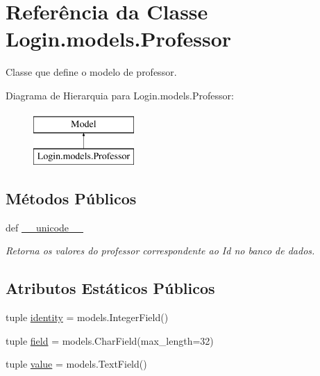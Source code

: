 \hypertarget{classLogin_1_1models_1_1Professor}{\section{Referência da Classe Login.\-models.\-Professor}
\label{dd/d57/classLogin_1_1models_1_1Professor}
}


Classe que define o modelo de professor.  


Diagrama de Hierarquia para Login.\-models.\-Professor\-:\begin{figure}[H]
\begin{center}
\leavevmode
\includegraphics[height=2.000000cm]{dd/d57/classLogin_1_1models_1_1Professor}
\end{center}
\end{figure}
\subsection*{Métodos Públicos}
\begin{DoxyCompactItemize}
\item 
def \hyperlink{classLogin_1_1models_1_1Professor_a018fdfc94208093b24334e0a0a6ef702}{\-\_\-\-\_\-unicode\-\_\-\-\_\-}
\begin{DoxyCompactList}\small\item\em Retorna os valores do professor correspondente ao Id no banco de dados. \end{DoxyCompactList}\end{DoxyCompactItemize}
\subsection*{Atributos Estáticos Públicos}
\begin{DoxyCompactItemize}
\item 
tuple \hyperlink{classLogin_1_1models_1_1Professor_a426ce75147797b70660e9c71d799166f}{identity} = models.\-Integer\-Field()
\item 
tuple \hyperlink{classLogin_1_1models_1_1Professor_a732c4e12511e022f94847bed2950de5b}{field} = models.\-Char\-Field(max\-\_\-length=32)
\item 
tuple \hyperlink{classLogin_1_1models_1_1Professor_a8d594170d11268f64121bd2336bf2964}{value} = models.\-Text\-Field()
\end{DoxyCompactItemize}


